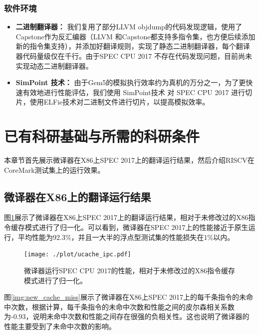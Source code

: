 \documentclass{Style/ucasproposal}%
\begin{document}
\subsubsection{软件环境}

\begin{itemize}
  \item \textbf{二进制翻译器：} 我们复用了部分LLVM objdump\cite{llvm_project}的代码发现逻辑，使用了Capstone\cite{CapstoneEngine2023}作为反汇编器（LLVM 和Capstone都支持多指令集，也方便后续添加新的指令集支持），并添加好翻译规则，实现了静态二进制翻译器，每个翻译器代码量级仅在千行。由于SPEC CPU 2017 不存在代码发现问题，目前尚未实现动态二进制翻译器。

  \item \textbf{SimPoint 技术：} 由于Gem5的模拟执行效率约为真机的万分之一，为了更快速有效地进行性能评估，我们使用 SimPoint技术\cite{sherwoodAutomaticallyCharacterizingLarge2002} 对 SPEC CPU 2017 进行切片，使用ELFie技术\cite{patilELFiesExecutableRegion2021}对二进制文件进行切片，以提高模拟效率。
\end{itemize}



\section{已有科研基础与所需的科研条件}

本章节首先展示微译器在X86上SPEC 2017上的翻译运行结果，然后介绍RISCV在CoreMark测试集上的运行效果。

\subsection{微译器在X86上的翻译运行结果}

图\ref{img:ucache_ipc}展示了微译器在X86上SPEC 2017上的翻译运行结果，相对于未修改过的X86指令缓存模式进行了归一化。可以看到，微译器在SPEC 2017上的性能接近于原生运行，平均性能为92.3\%，并且一大半的浮点型测试集的性能损失在1\%以内。

\begin{figure}[h]
  \centering
  \texttt{[image: ./plot/ucache\_ipc.pdf]}
  \caption{微译器运行SPEC CPU 2017的性能，相对于未修改过的X86指令缓存模式进行了归一化。}
  \label{img:ucache_ipc}
\end{figure}

图\ref{img:new_cache_miss}展示了微译器在X86上SPEC 2017上的每千条指令的未命中次数，根据计算，每千条指令的未命中次数和性能之间的皮尔森相关系数为-0.93，说明未命中次数和性能之间存在很强的负相关性。这也说明了微译器的性能主要受到了未命中次数的影响。
\end{document}
